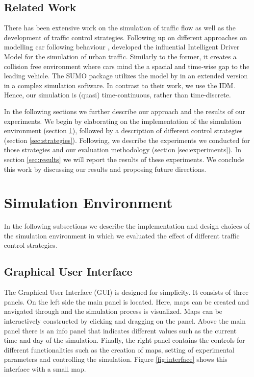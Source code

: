 \documentclass[10pt]{article}
\begin{document}
\subsection{Related Work}
\label{sec:related-work}
There has been extensive work on the simulation of traffic flow as well as the development of traffic control strategies. Following up on different approaches on modelling car following behaviour \citep[e.g.][]{gipps1981behavioural}, \citet{treiber2000congested} developed the influential Intelligent Driver Model for the simulation of urban traffic. Similarly to the former, it creates a collision free environment where cars mind the a spacial and time-wise gap to the leading vehicle. The SUMO package \citep{krajzewicz2002sumo, behrisch2011sumo} utilizes the model by \citep{gipps1981behavioural} in an extended version \citep{krauss1998microscopic} in a complex simulation software. In contrast to their work, we use the IDM. Hence, our simulation is (quasi) time-continuous, rather than time-discrete.

\vspace{20pt}

In the following sections we further describe our approach and the results of our experiments. We begin by elaborating on the implementation of the simulation environment (section \ref{sec:envi}), followed by a description of different control strategies (section \ref{sec:strategies}). Following, we describe the experiments we conducted for those strategies and our evaluation methodology (section \ref{sec:experiments}). In section \ref{sec:results} we will report the results of these experiments. We conclude this work by discussing our results and proposing future directions.
	
\section{Simulation Environment}
\label{sec:envi}
In the following subsections we describe the implementation and design choices of the simulation environment in which we evaluated the effect of different traffic control strategies.

\subsection{Graphical User Interface}
The Graphical User Interface (GUI) is designed for simplicity. It consists of three  panels. On the left side the main panel is located. Here, maps can be created and navigated through and the simulation process is visualized. Maps can be interactively constructed by clicking and dragging on the panel. Above the main panel there is an info panel that indicates different values such as the current time and day of the simulation. Finally, the right panel contains the controls for different functionalities such as the creation of maps, setting of experimental parameters and controlling the simulation. Figure \ref{fig:interface} shows this interface with a small map.
\end{document}
